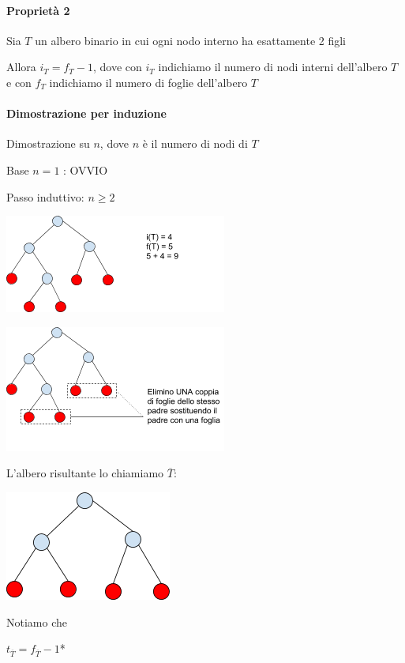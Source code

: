 \documentclass{article}
\let\oldparagraph\paragraph
\renewcommand{\paragraph}[1]{\oldparagraph{#1}\mbox{}}
\begin{document}
{{{\paragraph{Proprietà 2}

{Sia $T$ un albero binario in cui ogni nodo interno ha esattamente 2 figli}

{Allora $i_T=f_T-1$, dove con $i_T$ indichiamo il numero di nodi interni dell'albero $T$ e con $f_T$ indichiamo il numero di foglie dell'albero $T$}

\paragraph{Dimostrazione per induzione}

{Dimostrazione su $n$, dove $n$ è il numero di nodi di $T$}

{Base $n=1$ : OVVIO}

{Passo induttivo: $n \geq 2$}

{\includegraphics{images/image525.png}}

{\includegraphics{images/image536.png}}

{L'albero risultante lo chiamiamo $\overline{T}$:}

{\includegraphics{images/image522.png}}

{Notiamo che }

$t_{\overline{T}} = f_{\overline{T}}-1${*}

}}}
\end{document}
